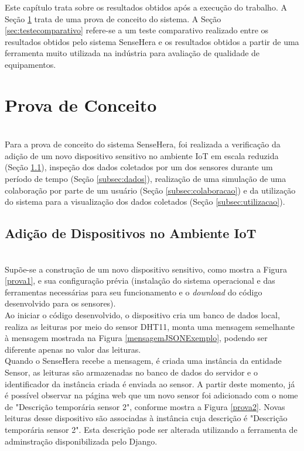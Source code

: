 
\quad Este capítulo trata sobre os resultados obtidos após a execução do trabalho. A Seção \ref{sec:provadeconceito} trata de uma prova de conceito do sistema. A Seção \ref{sec:testecomparativo} refere-se a um teste comparativo realizado entre os resultados obtidos pelo sistema SenseHera e os resultados obtidos a partir de uma ferramenta muito utilizada na indústria para avaliação de qualidade de equipamentos.
%
\section{Prova de Conceito}
\label{sec:provadeconceito}
\\\null \quad Para a prova de conceito do sistema SenseHera, foi realizada a verificação da adição de um novo dispositivo sensitivo no ambiente \acrshort{IoT} em escala reduzida (Seção \ref{subsec:dispositivo}), inspeção dos dados coletados por um dos sensores durante um período de tempo (Seção \ref{subsec:dados}), realização de uma simulação de uma colaboração por parte de um usuário (Seção \ref{subsec:colaboracao}) e da utilização do sistema para a visualização dos dados coletados (Seção \ref{subsec:utilizacao}).

\subsection{Adição de Dispositivos no Ambiente IoT}
\label{subsec:dispositivo}
\\\null \quad Supõe-se a construção de um novo dispositivo sensitivo, como mostra a Figura \ref{prova1}, e sua configuração prévia (instalação do sistema operacional e das ferramentas necessárias para seu funcionamento e o \textit{download} do código desenvolvido para os sensores).
\pagebreak
{}
\\\null \quad Ao iniciar o código desenvolvido, o dispositivo cria um banco de dados local, realiza as leituras por meio do sensor DHT11, monta uma mensagem semelhante à mensagem mostrada na Figura \ref{mensagemJSONExemplo}, podendo ser diferente apenas no valor das leituras.
\\\null \quad Quando o SenseHera recebe a mensagem, é criada uma instância da entidade Sensor, as leituras são armazenadas no banco de dados do servidor e o identificador da instância criada é enviada ao sensor. A partir deste momento, já é possível observar na página web que um novo sensor foi adicionado com o nome de "Descrição temporária sensor 2", conforme mostra a Figura \ref{prova2}. Novas leituras desse dispositivo são associadas à instância cuja descrição é "Descrição temporária sensor 2". Esta descrição pode ser alterada utilizando a ferramenta de adminstração disponibilizada pelo Django.
\pagebreak
{}

